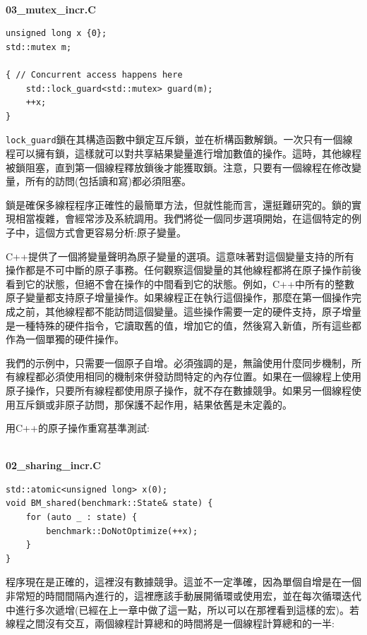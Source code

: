 \hspace*{\fill} \\ %
\noindent
\textbf{03\_mutex\_incr.C}
\begin{lstlisting}[style=styleCXX]
unsigned long x {0};
std::mutex m;

{ // Concurrent access happens here
	std::lock_guard<std::mutex> guard(m);
	++x;
}
\end{lstlisting}

\texttt{lock\_guard}鎖在其構造函數中鎖定互斥鎖，並在析構函數解鎖。一次只有一個線程可以擁有鎖，這樣就可以對共享結果變量進行增加數值的操作。這時，其他線程被鎖阻塞，直到第一個線程釋放鎖後才能獲取鎖。注意，只要有一個線程在修改變量，所有的訪問(包括讀和寫)都必須阻塞。

鎖是確保多線程程序正確性的最簡單方法，但就性能而言，還挺難研究的。鎖的實現相當複雜，會經常涉及系統調用。我們將從一個同步選項開始，在這個特定的例子中，這個方式會更容易分析:原子變量。

C++提供了一個將變量聲明為原子變量的選項。這意味著對這個變量支持的所有操作都是不可中斷的原子事務。任何觀察這個變量的其他線程都將在原子操作前後看到它的狀態，但絕不會在操作的中間看到它的狀態。例如，C++中所有的整數原子變量都支持原子增量操作。如果線程正在執行這個操作，那麼在第一個操作完成之前，其他線程都不能訪問這個變量。這些操作需要一定的硬件支持，原子增量是一種特殊的硬件指令，它讀取舊的值，增加它的值，然後寫入新值，所有這些都作為一個單獨的硬件操作。

我們的示例中，只需要一個原子自增。必須強調的是，無論使用什麼同步機制，所有線程都必須使用相同的機制來併發訪問特定的內存位置。如果在一個線程上使用原子操作，只要所有線程都使用原子操作，就不存在數據競爭。如果另一個線程使用互斥鎖或非原子訪問，那保護不起作用，結果依舊是未定義的。

用C++的原子操作重寫基準測試:

\hspace*{\fill} \\ %
\noindent
\textbf{02\_sharing\_incr.C}
\begin{lstlisting}[style=styleCXX]
std::atomic<unsigned long> x(0);
void BM_shared(benchmark::State& state) {
	for (auto _ : state) {
		benchmark::DoNotOptimize(++x);
	}
}
\end{lstlisting}

程序現在是正確的，這裡沒有數據競爭。這並不一定準確，因為單個自增是在一個非常短的時間間隔內進行的，這裡應該手動展開循環或使用宏，並在每次循環迭代中進行多次遞增(已經在上一章中做了這一點，所以可以在那裡看到這樣的宏)。若線程之間沒有交互，兩個線程計算總和的時間將是一個線程計算總和的一半:

